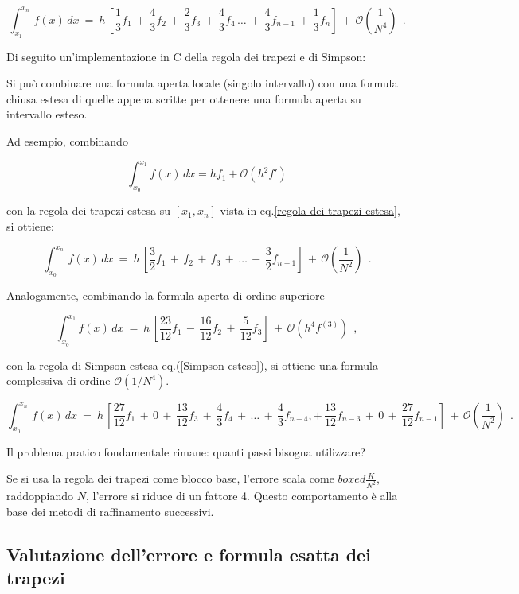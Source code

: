 \documentclass{article}
\begin{document}
	\begin{equation}\label{Simpson-esteso}
		\int_{x_1}^{x_n}\, f(x)\,dx\ =\ h\, \left[ \frac{1}{3}f_1\,+\,\frac{4}{3}f_2\,+\,\frac{2}{3}f_3\,+\,\frac{4}{3}f_4\,\dots\,+\,\frac{4}{3}f_{n-1}\,+\,\frac{1}{3}f_n\right]
		\,+\,\mathcal{O}\!\left(\frac{1}{N^4}\right)\ \ .
	\end{equation} 
	
	Di seguito un'implementazione in C della regola dei trapezi e di Simpson:
	
	
	Si può combinare una formula aperta locale (singolo intervallo) con una formula chiusa estesa di quelle appena scritte per ottenere una formula aperta su intervallo esteso. 
	
	Ad esempio, combinando
	
	\[
	\int_{x_0}^{x_1} f(x)\,dx
	=
	h f_1 + \mathcal{O}(h^2 f')
	\]
	
	con la regola dei trapezi estesa su $[x_1,x_n]$ vista in eq.\ref{regola-dei-trapezi-estesa}, si ottiene:
	
	\[ \int_{x_0}^{x_n}\, f(x)\, dx\ =\ h\, \left[ \frac{3}{2}f_1\, +\, f_2\, +\, f_3\, +\, \dots\, +\, \frac{3}{2}f_{n-1}\right]\,+\, \mathcal{O}\!\left(\frac{1}{N^2}\right)\ \ .\]
	
	Analogamente, combinando la formula aperta di ordine superiore
	
	\[ \int_{x_0}^{x_1} f(x)\,dx \ =\ h\,\left[ \frac{23}{12}f_1\,-\,\frac{16}{12}f_2\,+\,\frac{5}{12}f_3\right]\, +\, \mathcal{O}(h^4 f^{(3)})\ \ , \]
	
	con la regola di Simpson estesa eq.(\ref{Simpson-esteso}), si ottiene una formula complessiva di ordine $\mathcal{O}(1/N^4)$.
	
	\[ \int_{x_0}^{x_n}\, f(x)\, dx\ =\ h\, \left[ \frac{27}{12}f_1\, +\, 0\, +\, \frac{13}{12}f_3\, +\, \frac{4}{3} f_4\, +\,  \dots\, +\, \frac{4}{3}f_{n-4}, +\, \frac{13}{12}f_{n-3}\, +\, 0\, +\, \frac{27}{12}f_{n-1}\right]\,+\, \mathcal{O}\!\left(\frac{1}{N^2}\right)\ \ .\]
	
	\bigskip
	
	Il problema pratico fondamentale rimane: quanti passi bisogna utilizzare?
	
	Se si usa la regola dei trapezi come blocco base, l'errore scala come $boxed{\frac{K}{N^2}}$, raddoppiando $N$, l'errore si riduce di un fattore 4. Questo comportamento è alla base dei metodi di raffinamento successivi.
	
	\subsection{Valutazione dell’errore e formula esatta dei trapezi}
	
\end{document}
